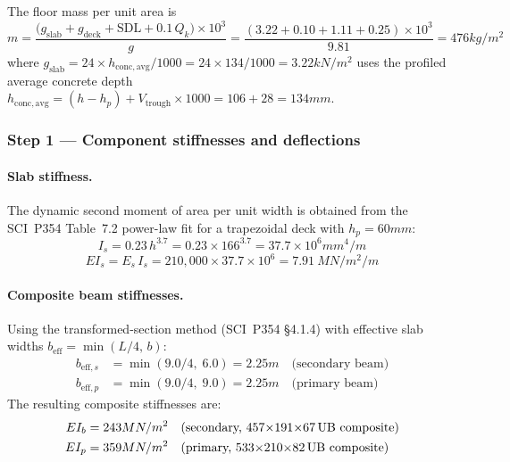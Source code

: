 The floor mass per unit area is
\begin{equation}
    m = \frac{\bigl(g_\mathrm{slab} + g_\mathrm{deck} + \mathrm{SDL} + 0.1\,Q_k\bigr) \times 10^3}{g}
      = \frac{(3.22 + 0.10 + 1.11 + 0.25)\times 10^3}{9.81}
      = 476kg/m^2
\end{equation}
where $g_\mathrm{slab} = 24 \times h_\mathrm{conc,avg}/1000 = 24 \times 134/1000 = 3.22 kN/m^2$ uses the profiled average concrete depth $h_\mathrm{conc,avg} = (h - h_p) + V_\mathrm{trough}{\times}1000 = 106 + 28 = 134mm$.

\subsubsection*{Step 1 --- Component stiffnesses and deflections}

\paragraph{Slab stiffness.}
The dynamic second moment of area per unit width is obtained from the SCI~P354 Table~7.2 power-law fit for a trapezoidal deck with $h_p = 60mm$:
\begin{equation}
    I_s = 0.23\,h^{3.7} = 0.23 \times 166^{3.7} = 37.7 \times 10^6 mm^4/m
\end{equation}
\begin{equation}
    EI_s = E_s\,I_s = 210{,}000 \times 37.7 \times 10^6 = 7.91\ MN/m^2/m
\end{equation}

\paragraph{Composite beam stiffnesses.}
Using the transformed-section method (SCI~P354 \S4.1.4) with effective slab widths $b_\mathrm{eff} = \min(L/4,\,b)$:
\begin{align}
    b_{\mathrm{eff},s} &= \min(9.0/4,\;6.0) = 2.25m \quad \text{(secondary beam)} \\
    b_{\mathrm{eff},p} &= \min(9.0/4,\;9.0) = 2.25m \quad \text{(primary beam)}
\end{align}
The resulting composite stiffnesses are:
\begin{align}
    EI_b &= 243 MN/m^2 \quad \text{(secondary, 457$\times$191$\times$67\,UB composite)} \\
    EI_p &= 359 MN/m^2 \quad \text{(primary, 533$\times$210$\times$82\,UB composite)}
\end{align}

